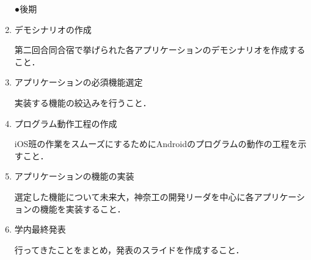 \begin{enumerate}
\par ●後期
\item デモシナリオの作成
\par 第二回合同合宿で挙げられた各アプリケーションのデモシナリオを作成すること．
\item アプリケーションの必須機能選定
\par 実装する機能の絞込みを行うこと．
\item プログラム動作工程の作成
\par iOS班の作業をスムーズにするためにAndroidのプログラムの動作の工程を示すこと．
\item アプリケーションの機能の実装
\par 選定した機能について未来大，神奈工の開発リーダを中心に各アプリケーションの機能を実装すること．
\item 学内最終発表
\par 行ってきたことをまとめ，発表のスライドを作成すること．
\end{enumerate}

